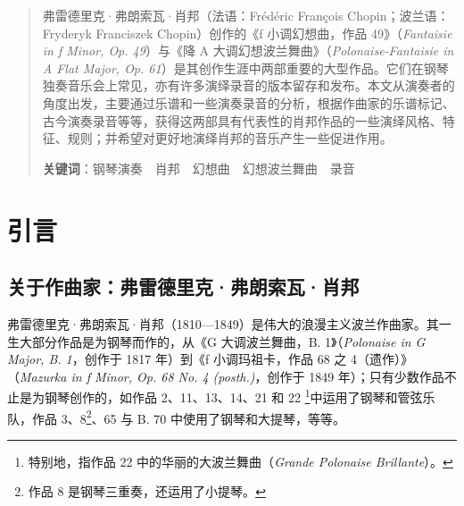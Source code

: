     \maketitle
    \begin{abstract}
        \noindent 弗雷德里克·弗朗索瓦·肖邦（法语：Frédéric François Chopin；波兰语：Fryderyk Franciszek Chopin）创作的《f 小调幻想曲，作品 49》（\textit{Fantaisie in f Minor, Op. 49}）与《降 A 大调幻想波兰舞曲》（\textit{Polonaise-Fantaisie in A Flat Major, Op. 61}）是其创作生涯中两部重要的大型作品。它们在钢琴独奏音乐会上常见，亦有许多演绎录音的版本留存和发布。本文从演奏者的角度出发，主要通过乐谱和一些演奏录音的分析，根据作曲家的乐谱标记、古今演奏录音等等，获得这两部具有代表性的肖邦作品的一些演绎风格、特征、规则；并希望对更好地演绎肖邦的音乐产生一些促进作用。

        \noindent \textbf{关键词}：钢琴演奏\ \ 肖邦\ \ 幻想曲\ \ 幻想波兰舞曲\ \ 录音
    \end{abstract}

    \newpage
    \tableofcontents
    \newpage

    \setlength\parindent{2em}

    \section{\heiti \fontsize{16}{19.2}\selectfont 引言}
    \subsection{\heiti \fontsize{15}{18} \selectfont 关于作曲家：弗雷德里克·弗朗索瓦·肖邦}
    弗雷德里克·弗朗索瓦·肖邦（1810—1849）是伟大的浪漫主义波兰作曲家。其一生大部分作品是为钢琴而作的，从《G 大调波兰舞曲，B. 1》（\textit{Polonaise in G Major, B. 1}，创作于 1817 年）到《f 小调玛祖卡，作品 68 之 4（遗作）》（\textit{Mazurka in f Minor, Op. 68 No. 4 (posth.)}，创作于 1849 年）；只有少数作品不止是为钢琴创作的，如作品 2、11、13、14、21 和 22 \footnote{特别地，指作品 22 中的华丽的大波兰舞曲（\textit{Grande Polonaise Brillante}）。}中运用了钢琴和管弦乐队，作品 3、8\footnote{作品 8 是钢琴三重奏，还运用了小提琴。}、65 与 B. 70 中使用了钢琴和大提琴，等等。

